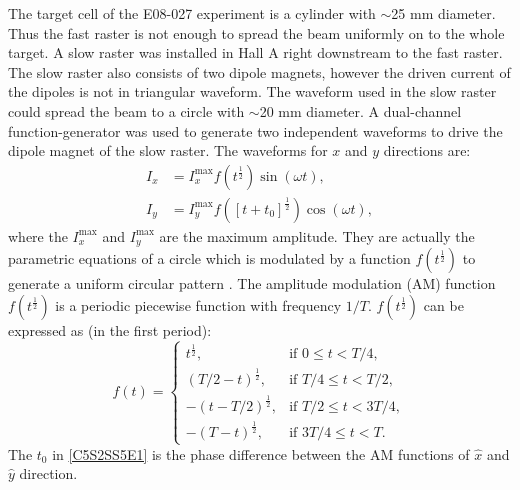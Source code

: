 The target cell of the E08-027 experiment is a cylinder with $\sim$25 mm diameter. Thus the fast raster is not enough to spread the beam uniformly on to the whole target. A slow raster was installed in Hall A right downstream to the fast raster. The slow raster also consists of two dipole magnets, however the driven current of the dipoles is not in triangular waveform. The waveform used in the slow raster could spread the beam to a circle with $\sim$20 mm diameter. A dual-channel function-generator was used to generate two independent waveforms to drive the dipole magnet of the slow raster. The waveforms for $x$ and $y$ directions are:
\begin{align} \label{C5S2SS5E1}
I_x & = I_x^{\mathrm{max}}f(t^{\frac{1}{2}})\sin(\omega t), \\ \label{C5S2SS5E2}
I_y & = I_y^{\mathrm{max}}f([t+t_0]^{\frac{1}{2}})\cos(\omega t),
\end{align}
where the $I_x^{\mathrm{max}}$ and $I_y^{\mathrm{max}}$ are the maximum amplitude. They are actually the parametric equations of a circle which is modulated by a function $f(t^{\frac{1}{2}})$ to generate a uniform circular pattern \cite{Yan2005}. The amplitude modulation (AM) function $f(t^{\frac{1}{2}})$ is a periodic piecewise function with frequency $1/T$. $f(t^{\frac{1}{2}})$ can be expressed as (in the first period):
\begin{equation} \label{C5S2SS5E3}
f(t) =
\begin{cases}
t^{\frac{1}{2}}, & \text{if } 0\leq t<T/4, \\
(T/2-t)^{\frac{1}{2}}, & \text{if } T/4\leq t<T/2, \\
-(t-T/2)^{\frac{1}{2}}, & \text{if } T/2\leq t<3T/4, \\
-(T-t)^{\frac{1}{2}}, & \text{if } 3T/4\leq t<T.
\end{cases}
\end{equation}
The $t_0$ in \cref{C5S2SS5E1} is the phase difference between the AM functions of $\hat{x}$ and $\hat{y}$ direction.

